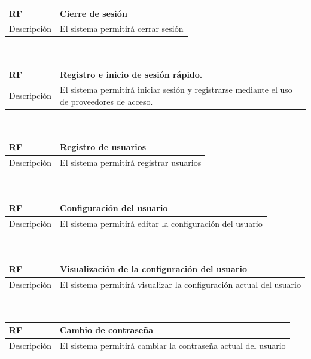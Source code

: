 \documentclass[twoside]{report}
\newcommand\addrow[2]{#1 &#2\\ }
\newcommand\addheading[2]{#1 &#2\\ \hline}
\newcommand\tabularhead{\begin{tabular}{lp{0.7\textwidth}}
\hline
}
\newenvironment{req}{\tabularhead}
{\hline\end{tabular}}
\begin{document}
\vspace{0.25cm}

\begin{req}
	\addheading{\textbf{RF\arabic{functionalRequirements}}}{Cierre de sesión}
	\addrow{Descripción}{El sistema permitirá cerrar sesión}
\end{req} \\

\vspace{0.25cm}
 
\begin{req}
	\addheading{\textbf{RF\arabic{functionalRequirements}}}{Registro e inicio de sesión rápido.}
	\addrow{Descripción}{El sistema permitirá iniciar sesión y registrarse mediante el uso de proveedores de acceso.}
\end{req} \\

\vspace{0.25cm}

\begin{req}
	\addheading{\textbf{RF\arabic{functionalRequirements}}}{Registro de usuarios}
	\addrow{Descripción}{El sistema permitirá registrar usuarios}
\end{req}\\

\vspace{0.25cm}

\begin{req}
	\addheading{\textbf{RF\arabic{functionalRequirements}}}{Configuración del usuario}
	\addrow{Descripción}{El sistema permitirá editar la configuración del usuario}
\end{req}\\

\vspace{0.25cm}

\begin{req}
	\addheading{\textbf{RF\arabic{functionalRequirements}}}{Visualización de la configuración del usuario}
	\addrow{Descripción}{El sistema permitirá visualizar la configuración actual del usuario}
\end{req}\\

\vspace{0.25cm}

\begin{req}
	\addheading{\textbf{RF\arabic{functionalRequirements}}}{Cambio de contraseña}
	\addrow{Descripción}{El sistema permitirá cambiar la contraseña actual del usuario}
\end{req}\\
\end{document}
